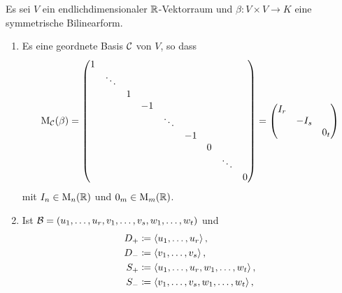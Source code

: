 \begin{corollary}
  Es sei $V$ ein endlichdimensionaler $\mathbb{R}$-Vek\-tor\-raum und $\beta \colon V \times V \to K$ eine symmetrische Bilinearform.
  \begin{enumerate}[leftmargin=*, label=\roman*)]
    \item
      Es eine geordnete Basis $\mathcal{C}$ von $V$, so dass
      \[
        \mathrm{M}_{\mathcal{C}}(\beta)
        =
        \begin{pmatrix}
          1 &         &   &     &         &     &   &         &   \\                                                        
            & \ddots  &   &     &         &     &   &         &   \\
            &         & 1 &     &         &     &   &         &   \\
            &         &   & -1  &         &     &   &         &   \\
            &         &   &     & \ddots  &     &   &         &   \\
            &         &   &     &         & -1  &   &         &   \\
            &         &   &     &         &     & 0 &         &   \\
            &         &   &     &         &     &   & \ddots  &   \\
            &         &   &     &         &     &   &         & 0
        \end{pmatrix}
        =
        \begin{pmatrix}
          I_r &       &     \\
              & -I_s  &     \\
              &       & 0_t
        \end{pmatrix}
      \]
      mit $I_n \in \mathrm{M}_n(\mathbb{R})$ und $0_m \in \mathrm{M}_m(\mathbb{R})$.
    \item
      Ist $\mathcal{B} = (u_1, \dotsc, u_r, v_1, \dotsc, v_s, w_1, \dotsc, w_t)$ und
      \begin{align*}
        D_+ &\coloneqq \left\langle u_1, \dotsc, u_r \right\rangle,                    \\
        D_- &\coloneqq \left\langle v_1, \dotsc, v_s \right\rangle,                    \\
        S_+ &\coloneqq \left\langle u_1, \dotsc, u_r, w_1, \dotsc, w_t \right\rangle,  \\
        S_- &\coloneqq \left\langle v_1, \dotsc, v_s, w_1, \dotsc, w_t \right\rangle,
      \end{align*}

\end{enumerate}
\end{corollary}
